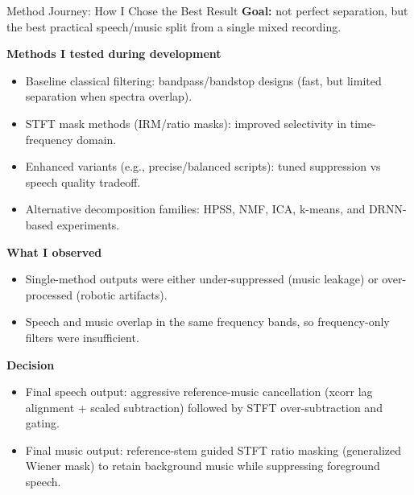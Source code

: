 \documentclass[aspectratio=169]{beamer}
\begin{document}
\begin{frame}{Method Journey: How I Chose the Best Result}
\footnotesize
\textbf{Goal:} not perfect separation, but the best practical speech/music split from a single mixed recording.

\vspace{1mm}
\textbf{Methods I tested during development}
{\setlength{\itemsep}{0.25em}
\begin{itemize}
  \item Baseline classical filtering: bandpass/bandstop designs (fast, but limited separation when spectra overlap).
  \item STFT mask methods (IRM/ratio masks): improved selectivity in time-frequency domain.
  \item Enhanced variants (e.g., precise/balanced scripts): tuned suppression vs speech quality tradeoff.
  \item Alternative decomposition families: HPSS, NMF, ICA, k-means, and DRNN-based experiments.
\end{itemize}}

\textbf{What I observed}
{\setlength{\itemsep}{0.25em}
\begin{itemize}
  \item Single-method outputs were either under-suppressed (music leakage) or over-processed (robotic artifacts).
  \item Speech and music overlap in the same frequency bands, so frequency-only filters were insufficient.
\end{itemize}}

\textbf{Decision}
{\setlength{\itemsep}{0.25em}
\begin{itemize}
  \item Final speech output: aggressive reference-music cancellation (xcorr lag alignment + scaled subtraction) followed by STFT over-subtraction and gating.
  \item Final music output: reference-stem guided STFT ratio masking (generalized Wiener mask) to retain background music while suppressing foreground speech.
\end{itemize}}
\end{frame}
\end{document}
